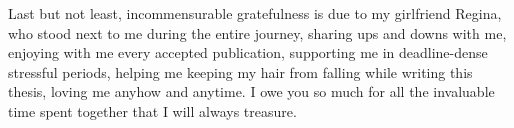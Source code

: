 Last but not least, incommensurable gratefulness is due to my girlfriend Regina, who stood next to me during the entire journey,
sharing ups and downs with me, enjoying with me every accepted publication, supporting me in deadline-dense stressful periods, helping me keeping my hair from falling while writing this thesis, loving me anyhow and anytime.
I owe you so much for all the invaluable time spent together that I will always treasure.